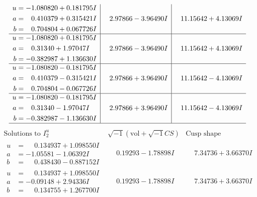 \documentclass[1p]{elsarticle_modified}
\theoremstyle{definition}
\newcommand{\I}{\sqrt{-1}}
\begin{document}
$$\begin{array}{c|c|c}
\begin{aligned}
u &= -1.080820 + 0.181795 I \\
a &= \phantom{-}0.410379 + 0.315421 I \\
b &= \phantom{-}0.704804 + 0.067726 I\end{aligned}
 & \phantom{-}2.97866 - 3.96490 I & \phantom{-}11.15642 + 4.13069 I \\ \hline\begin{aligned}
u &= -1.080820 + 0.181795 I \\
a &= \phantom{-}0.31340 + 1.97047 I \\
b &= -0.382987 + 1.136630 I\end{aligned}
 & \phantom{-}2.97866 - 3.96490 I & \phantom{-}11.15642 + 4.13069 I \\ \hline\begin{aligned}
u &= -1.080820 - 0.181795 I \\
a &= \phantom{-}0.410379 - 0.315421 I \\
b &= \phantom{-}0.704804 - 0.067726 I\end{aligned}
 & \phantom{-}2.97866 + 3.96490 I & \phantom{-}11.15642 - 4.13069 I \\ \hline\begin{aligned}
u &= -1.080820 - 0.181795 I \\
a &= \phantom{-}0.31340 - 1.97047 I \\
b &= -0.382987 - 1.136630 I\end{aligned}
 & \phantom{-}2.97866 + 3.96490 I & \phantom{-}11.15642 - 4.13069 I\\
 \hline 
 \end{array}$$\newpage$$\begin{array}{c|c|c}  
\text{Solutions to }I^u_{2}& \I (\text{vol} + \sqrt{-1}CS) & \text{Cusp shape}\\
 \hline 
\begin{aligned}
u &= \phantom{-}0.134937 + 1.098550 I \\
a &= -1.05581 - 1.06392 I \\
b &= \phantom{-}0.438430 - 0.887152 I\end{aligned}
 & \phantom{-}0.19293 - 1.78898 I & \phantom{-}7.34736 + 3.66370 I \\ \hline\begin{aligned}
u &= \phantom{-}0.134937 + 1.098550 I \\
a &= -0.09148 + 2.94336 I \\
b &= \phantom{-}0.134755 + 1.267700 I\end{aligned}
 & \phantom{-}0.19293 - 1.78898 I & \phantom{-}7.34736 + 3.66370 I \\ \hline\begin{aligned}

\end{aligned}
\end{array}$$
\end{document}
